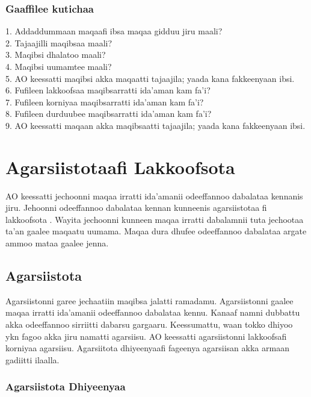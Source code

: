 \documentclass[11pt,b5paper]{book}
\begin{document}
\subsubsection{Gaaffilee kutichaa}

	1. Addaddummaan maqaafi ibsa maqaa gidduu jiru maali?\\
	2. Tajaajilli maqibsaa maali?\\
	3. Maqibsi dhalatoo maali?\\
	4. Maqibsi uumamtee maali?\\
	5. AO keessatti maqibsi akka maqaatti tajaajila; yaada kana
	fakkeenyaan ibsi.\\
	6. Fufileen lakkoofsaa maqibsarratti ida’aman kam fa’i?\\
	7. Fufileen korniyaa maqibsarratti ida’aman kam fa’i?\\
	8. Fufileen durduubee maqibsarratti ida’aman kam fa’i?\\
	9. AO keessatti maqaan akka maqibsaatti tajaajila; yaada
	kana fakkeenyaan ibsi. 

\newpage
\section{Agarsiistotaafi Lakkoofsota}

AO keessatti jechoonni maqaa irratti ida'amanii odeeffannoo dabalataa kennanis jiru. Jehoonni odeeffannoo dabalataa kennan kunneenis agarsiistotaa fi lakkoofsota . Wayita jechoonni kunneen maqaa irratti dabalamnii tuta jechootaa ta’an gaalee maqaatu uumama. Maqaa dura dhufee odeeffannoo dabalataa argate ammoo mataa gaalee jenna. 

\subsection{Agarsiistota}
Agarsiistonni garee jechaatiin maqibsa jalatti ramadamu. Agarsiistonni gaalee maqaa irratti ida'amanii odeeffannoo
dabalataa kennu. Kanaaf namni dubbattu akka odeeffannoo sirriitti dabarsu gargaaru. Keessumattu, waan tokko dhiyoo
ykn fagoo akka jiru namatti agarsiisu. AO keessatti agarsiistonni lakkoofsafi korniyaa agarsiisu. Agarsiitota
dhiyeenyaafi fageenya agarsiisan akka armaan gadiitti ilaalla. 

\subsubsection{Agarsiistota Dhiyeenyaa}
\end{document}
